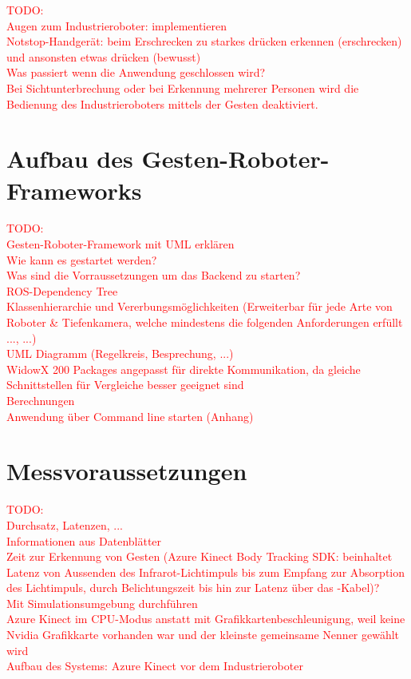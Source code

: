 \textcolor{red}{TODO:\\
Augen zum Industrieroboter: implementieren\\
Notstop-Handgerät: beim Erschrecken zu starkes drücken erkennen (erschrecken) und ansonsten etwas drücken (bewusst)\\
Was passiert wenn die Anwendung geschlossen wird?\\
Bei Sichtunterbrechung oder bei Erkennung mehrerer Personen wird die Bedienung des Industrieroboters mittels der Gesten deaktiviert.
}

\section{Aufbau des Gesten-Roboter-Frameworks}
\textcolor{red}{TODO:\\
Gesten-Roboter-Framework mit UML erklären\\
Wie kann es gestartet werden?\\
Was sind die Vorraussetzungen um das Backend zu starten?\\
ROS-Dependency Tree\\
Klassenhierarchie und Vererbungsmöglichkeiten (Erweiterbar für jede Arte von Roboter \& Tiefenkamera, welche mindestens die folgenden Anforderungen erfüllt ..., ...)\\
UML Diagramm (Regelkreis, Besprechung, ...)\\
WidowX 200 Packages angepasst für direkte Kommunikation, da gleiche Schnittstellen für Vergleiche besser geeignet sind\\
Berechnungen\\
Anwendung über Command line starten (Anhang)
}

\section{Messvoraussetzungen}
\textcolor{red}{TODO:\\
Durchsatz, Latenzen, ...\\
Informationen aus Datenblätter\\
Zeit zur Erkennung von Gesten (Azure Kinect Body Tracking SDK: beinhaltet Latenz von Aussenden des Infrarot-Lichtimpuls bis zum Empfang zur Absorption des Lichtimpuls, durch Belichtungszeit bis hin zur Latenz über das -Kabel)?\\
Mit Simulationsumgebung durchführen\\
Azure Kinect im CPU-Modus anstatt mit Grafikkartenbeschleunigung, weil keine Nvidia Grafikkarte vorhanden war und der kleinste gemeinsame Nenner gewählt wird\\
Aufbau des Systems: Azure Kinect vor dem Industrieroboter
}
